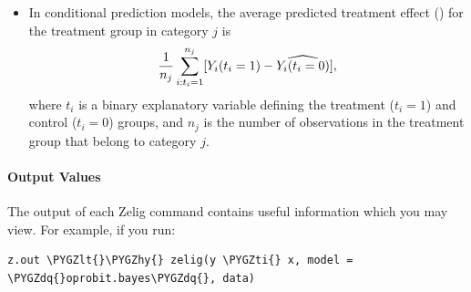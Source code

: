 \documentclass[letterpaper,10pt,english]{sphinxmanual}
\def\PYGZlt{\char`\<}
\def\PYGZhy{\char`\-}
\def\PYGZdq{\char`\"}
\def\PYGZti{\char`\~}
\begin{document}
\begin{itemize}
\item {} 
In conditional prediction models, the average predicted treatment
effect () for the treatment group in category \(j\)
is
\begin{gather}
\begin{split}\begin{aligned}
\frac{1}{n_j}\sum_{i:t_{i}=1}^{n_j}[Y_{i}(t_{i}=1)-\widehat{Y_{i}(t_{i}=0)}],\end{aligned}\end{split}\notag
\end{gather}
where \(t_{i}\) is a binary explanatory variable defining the
treatment (\(t_{i}=1\)) and control (\(t_{i}=0\)) groups, and
\(n_j\) is the number of observations in the treatment group that
belong to category \(j\).

\end{itemize}


\paragraph{Output Values}
\label{zelig-oprobitbayes:output-values}
The output of each Zelig command contains useful information which you
may view. For example, if you run:

\begin{Verbatim}[commandchars=\\\{\}]
z.out \PYGZlt{}\PYGZhy{} zelig(y \PYGZti{} x, model = \PYGZdq{}oprobit.bayes\PYGZdq{}, data)
\end{Verbatim}
\end{document}
